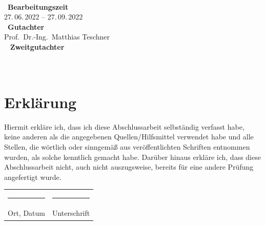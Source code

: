 \documentclass[11pt,
a4paper,
parskip=half, %
BCOR=10mm, %
english,
ngerman]{scrreprt}
\newcommand{\firstexaminer}{Prof.~Dr.-Ing.~Matthias Teschner}
\newcommand{\advisers}{Prof.~Dr.-Ing.~Matthias Teschner}
\begin{document}
    \thispagestyle{empty}
    \ \vfill \ \\  %
    \
    \textbf{Bearbeitungszeit}            \smallskip{} \\
    27.\,06.\,2022 -- 27.\,09.\,2022   \bigskip{} \\
    \
    \textbf{Gutachter}                  \smallskip{} \\
    \firstexaminer                      \bigskip{} \\
    \
    \ifdef{\secondexaminer}
        {
        \textbf{Zweitgutachter}        \smallskip{} \\
        \secondexaminer                \bigskip{} \\
        \
        }
        {
        }



\chapter*{Erklärung}

Hiermit erkläre ich, dass ich diese Abschlussarbeit selbständig verfasst habe, keine anderen
als die angegebenen Quellen/Hilfsmittel verwendet habe und alle Stellen, die wörtlich oder
sinngemäß aus veröffentlichten Schriften entnommen wurden, als solche kenntlich gemacht
habe. Darüber hinaus erkläre ich, dass diese Abschlussarbeit nicht, auch nicht
auszugsweise, bereits für eine andere Prüfung angefertigt wurde.
\\[3\normalbaselineskip]
\begin{tabular}{p{0.5\textwidth} l}
  \rule{0.3\textwidth}{0.4pt}   &   \rule{0.4\textwidth}{0.4pt} \\
  Ort, Datum                  &   Unterschrift
\end{tabular}

\tableofcontents
\listoffigures
\listoftables
\end{document}
